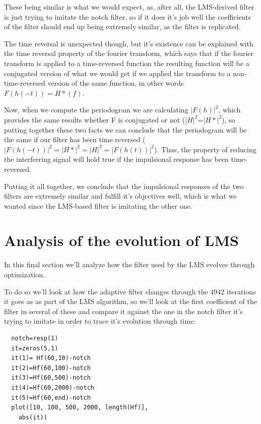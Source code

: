 \documentclass[conference,9pt]{IEEEtran}
\begin{document}
These being similar is what we would expect, as, after all, the LMS-derived filter is just trying to imitate the notch filter, so if it does it's job well the coefficients of the filter should end up being extremely similar, as the filter is replicated.

The time reversal is unexpected though, but it's existence can be explained with the time reversal property of the fourier transform, which says that if the fourier transform is applied to a time-reversed function the resulting function will be a conjugated version of what we would get if we applied the transform to a non-time-reversed version of the same function, in other words $F(h(-t))=H*(f)$.

Now, when we compute the periodogram we are calculating $|F(h)|^2$, which provides the same results whether F is conjugated or not ($|H|^2$=$|H*|^2$), so putting together these two facts we can conclude that the periodogram will be the same if our filter has been time reversed ($|F(h(-t))|^2=|H*|^2=|H|^2=|F(h(t))|^2$). Thus, the property of reducing the interferring signal will hold true if the impulsional response has been time-reversed.

Putting it all together, we conclude that the impulsional responses of the two filters are extremely similar and fulfill it's objectives well, which is what we wanted since the LMS-based filter is imitating the other one.

\section{Analysis of the evolution of LMS}
In this final section we'll analyze how the filter used by the LMS evolves through optimization.

To do so we'll look at how the adaptive filter changes through the 4942 iterations it goes as as part of the LMS algorithm, so we'll look at the first coefficient of the filter in several of these and compare it against the one in the notch filter it's trying to imitate in order to trace it's evolution through time:

\begin{verbatim}
  notch=resp(1)
  it=zeros(5,1)
  it(1)= Hf(60,10)-notch
  it(2)=Hf(60,100)-notch
  it(3)=Hf(60,500)-notch
  it(4)=Hf(60,2000)-notch
  it(5)=Hf(60,end)-notch
  plot([10, 100, 500, 2000, length(Hf)],
    abs(it))
\end{verbatim}
\end{document}
